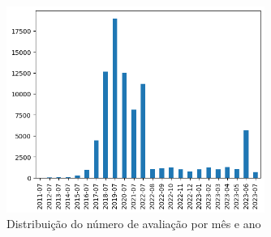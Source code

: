 \begin{figure}
	\centering
	\includegraphics[width=0.75\textwidth]{figs/exploratoria/distribuicao_ano_mes_avaliacao.png}
	\caption{Distribuição do número de avaliação por mês e ano}
	\label{img:dist_ano_mes_avaliacao}
\end{figure}

